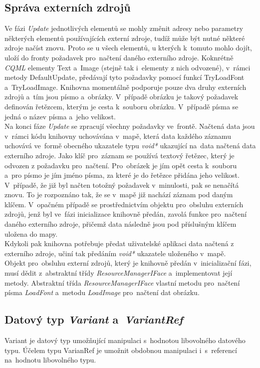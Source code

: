 \documentclass[11pt,twoside,a4paper]{book}
\begin{document}
\subsection{\label{SEC:ext}Správa externích zdrojů}
Ve fázi \textit{Update} jednotlivých elementů se mohly změnit adresy nebo parametry některých elementů používajících externí zdroje, tudíž může být nutné některé zdroje načíst znovu. Proto se u všech elementů, u kterých k~tomuto mohlo dojít, uloží do fronty požadavek pro~načtení daného externího zdroje. Koknrétně \textit{CQML} elementy Text a~Image (stejně tak i~elementy z nich odvozené), v~rámci metody DefaultUpdate, předávají tyto požadavky pomocí funkcí TryLoadFont a~TryLoadImage. Knihovna momentálně podporuje pouze dva druhy externích zdrojů a~tím jsou písmo a~obrázky. V~případě obrázku je takový požadavek definován řetězcem, kterým je cesta k~souboru obrázku. V~případě písma se jedná o název písma a~jeho velikost. \\
Na konci fáze \textit{Update} se zpracují všechny požadavky ve~frontě. Načtená data jsou v~rámci kódu knihovny uchovávána v~mapě, která data každého záznamu uchovává ve~formě obecného ukazatele typu \textit{void*} ukazující na~data načtená data externího zdroje. Jako klíč pro~záznam se používá textový řetězec, který je odvozen z požadavku pro~načtení. Pro~obrázek je jím opět cesta k~souboru a~pro písmo je jím jméno písma, za které je do řetězce přidána jeho velikost. V~případě, že již byl načten totožný požadavek v~minulosti, pak se nenačítá znovu. To je rozpoznáno tak, že se v~mapě již nachází záznam pod daným klíčem. V~opačném případě se prostřednictvím objektu pro~obsluhu externích zdrojů, jenž byl ve~fázi inicializace knihovně předán, zavolá funkce pro~načtení daného externího zdroje, přičemž data následně jsou pod příslušným klíčem uložena do mapy.\\
Kdykoli pak knihovna potřebuje předat uživatelské aplikaci data načtená z externího zdroje, učiní tak předáním \textit{void*} ukazatele uloženého v~mapě.\\
Objekt pro~obsluhu externí zdrojů, který je knihovně předán v~inicializační fázi, musí dědit z~abstraktní třídy \textit{ResourceManagerIFace} a~implementovat její metody. Abstraktní třída \textit{ResourceManagerIFace} vlastní metodu pro~načtení písma \textit{LoadFont} a~metodu \textit{LoadImage} pro~načtení dat obrázku.

\subsection{Datový typ \textit{Variant} a~\textit{VariantRef}}
Variant je datový typ umožňující manipulaci s~hodnotou libovolného datového typu. Účelem typu VarianRef je umožnit obdobnou manipulaci i~s~referencí na~hodnotu libovolného typu.\\
\end{document}
